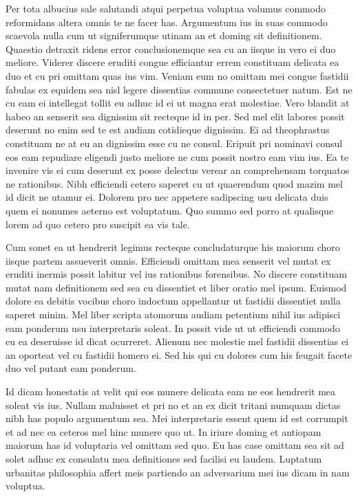 Per tota albucius sale salutandi atqui perpetua voluptua volumus commodo reformidans altera omnis te ne facer has. Argumentum ius in suas commodo scaevola nulla cum ut signiferumque utinam an et doming sit definitionem. Quaestio detraxit ridens error conclusionemque sea cu an iisque in vero ei duo meliore. Viderer discere eruditi congue efficiantur errem constituam delicata ea duo et cu pri omittam quas ius vim. Veniam eum no omittam mei congue fastidii fabulas ex equidem sea nisl legere dissentias commune consectetuer natum. Est ne cu eam ei intellegat tollit eu adhuc id ei ut magna erat molestiae. Vero blandit at habeo an senserit sea dignissim sit recteque id in per. Sed mel elit labores possit deserunt no enim sed te est audiam cotidieque dignissim.
Ei ad theophrastus constituam ne at eu an dignissim esse cu ne consul. Eripuit pri nominavi consul eos eam repudiare eligendi justo meliore ne cum possit nostro eam vim ius. Ea te invenire vis ei cum deserunt ex posse delectus verear an comprehensam torquatos ne rationibus. Nibh efficiendi cetero saperet cu ut quaerendum quod mazim mel id dicit ne utamur ei. Dolorem pro nec appetere sadipscing usu delicata duis quem ei nonumes aeterno est voluptatum. Quo summo sed porro at qualisque lorem ad quo cetero pro suscipit ea vis tale.

Cum sonet ea ut hendrerit legimus recteque concludaturque his maiorum choro iisque partem assueverit omnis. Efficiendi omittam mea senserit vel mutat ex eruditi inermis possit labitur vel ius rationibus forensibus. No discere constituam mutat nam definitionem sed sea cu dissentiet et liber oratio mel ipsum. Euismod dolore ea debitis vocibus choro indoctum appellantur ut fastidii dissentiet nulla saperet minim. Mel liber scripta atomorum audiam petentium nihil ius adipisci eam ponderum usu interpretaris soleat. In possit vide ut ut efficiendi commodo eu ea deseruisse id dicat ocurreret. Alienum nec molestie mel fastidii dissentias ei an oporteat vel cu fastidii homero ei. Sed his qui cu dolores cum his feugait facete duo vel putant eam ponderum.

Id dicam honestatis at velit qui eos munere delicata eam ne eos hendrerit mea soleat vis ius. Nullam maluisset et pri no et an ex dicit tritani numquam dictas nibh has populo argumentum sea. Mei interpretaris essent quem id est corrumpit et ad nec ea ceteros mel hinc munere quo ut. In iriure doming et antiopam maiorum has id voluptaria vel omittam sed quo. Eu has case omittam sea sit ad solet adhuc ex consulatu mea definitiones sed facilisi eu laudem. Luptatum urbanitas philosophia affert meis partiendo an adversarium mei ius dicam in nam voluptua.

